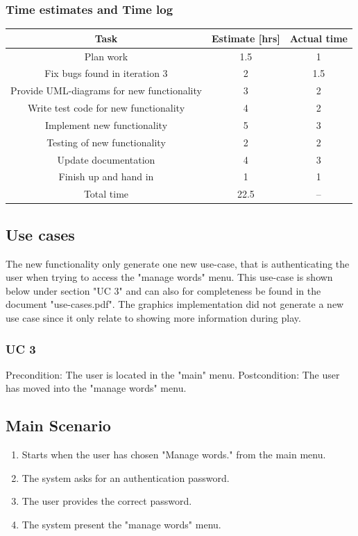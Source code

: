 \documentclass[12pt, letterpaper]{article}
\begin{document}
\subsubsection{Time estimates and Time log}
\begin{center}
	\begin{tabular}{|c|c|c|} 
		\hline
		Task & Estimate [hrs] & Actual time \\ [0.5ex] 
		\hline\hline
		Plan work & 1.5 & 1 \\ 
		\hline
		Fix bugs found in iteration 3 & 2 & 1.5 \\
		\hline 
		Provide UML-diagrams for new functionality & 3 & 2 \\  
		\hline
		Write test code for new functionality & 4 & 2 \\ 
		\hline
		Implement new functionality & 5 & 3 \\ 
		\hline
		Testing of new functionality & 2 & 2 \\ 
		\hline
		Update documentation & 4 & 3 \\ 
		\hline
		Finish up and hand in & 1 & 1\\ 
		\hline 
		Total time & 22.5 & --\\ [1ex]
		\hline
		
	\end{tabular}
\end{center}
\newpage
\subsection{Use cases}
The new functionality only generate one new use-case, that is authenticating the user when trying to access the "manage words" menu. This use-case is shown below under section "UC 3" and can also for completeness be found in the document "use-cases.pdf". The graphics implementation did not generate a new use case since it only relate to showing more information during play.
\subsubsection{UC 3}
Precondition: The user is located in the "main" menu.
\newline
Postcondition: The user has moved into the "manage words" menu.
\subsection{Main Scenario}
\begin{enumerate}
	\item Starts when the user has chosen "Manage words." from the main menu.
	\item The system asks for an authentication password.
	\item The user provides the correct password.
	\item The system present the "manage words" menu.
\end{enumerate}
\end{document}

